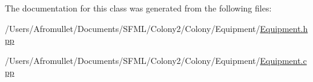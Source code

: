 The documentation for this class was generated from the following files\+:\begin{DoxyCompactItemize}
\item 
/\+Users/\+Afromullet/\+Documents/\+S\+F\+M\+L/\+Colony2/\+Colony/\+Equipment/\mbox{\hyperlink{_equipment_8hpp}{Equipment.\+hpp}}\item 
/\+Users/\+Afromullet/\+Documents/\+S\+F\+M\+L/\+Colony2/\+Colony/\+Equipment/\mbox{\hyperlink{_equipment_8cpp}{Equipment.\+cpp}}\end{DoxyCompactItemize}
